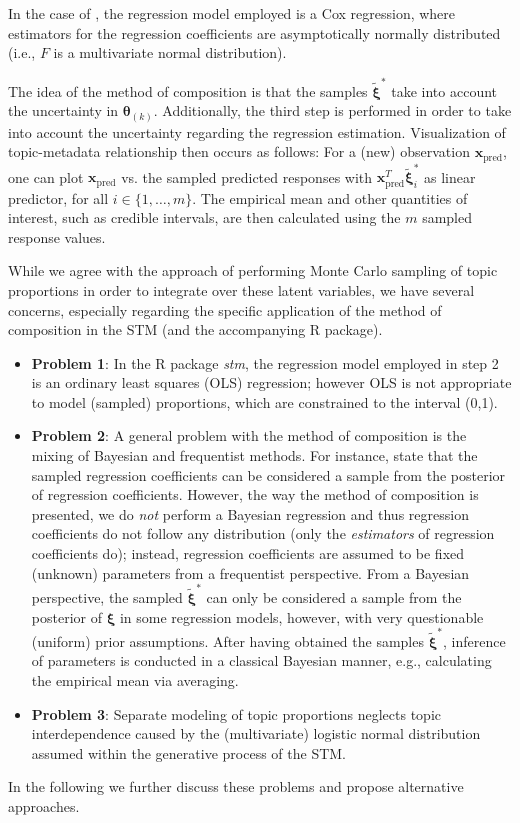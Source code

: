 In the case of \cite{treier2008democracy}, the regression model employed is a Cox regression, where estimators for the regression coefficients are asymptotically normally distributed (i.e., $F$ is a multivariate normal distribution).

The idea of the method of composition is that the samples $\tilde{\boldsymbol{\xi}}^*$ take into account the uncertainty in $\boldsymbol{\theta}_{(k)}$. Additionally, the third step is performed in order to take into account the uncertainty regarding the regression estimation. Visualization of topic-metadata relationship then occurs as follows: For a (new) observation $\boldsymbol{x}_{\text{pred}}$, one can plot $\boldsymbol{x}_{\text{pred}}$ vs. the sampled predicted responses with $\boldsymbol{x}_{\text{pred}}^T \tilde{\boldsymbol{\xi}}_i^*$ as linear predictor, for all $i \in \{1,\dots,m\}$. The empirical mean and other quantities of interest, such as credible intervals, are then calculated using the $m$ sampled response values.

While we agree with the approach of performing Monte Carlo sampling of topic proportions in order to integrate over these latent variables, we have several concerns, especially regarding the specific application of the method of composition in the STM (and the accompanying R package).
\begin{itemize}
\item \textbf{Problem 1}: In the R package \textit{stm}, the regression model employed in step 2 is an ordinary least squares (OLS) regression; however OLS is not appropriate to model (sampled) proportions, which are constrained to the interval (0,1).
\item \textbf{Problem 2}: A general problem with the method of composition is the mixing of Bayesian and frequentist methods. For instance, \cite{treier2008democracy} state that the sampled regression coefficients can be considered a sample from the posterior of regression coefficients. However, the way the method of composition is presented, we do \textit{not} perform a Bayesian regression and thus regression coefficients do not follow any distribution (only the \textit{estimators} of regression coefficients do); instead, regression coefficients are assumed to be fixed (unknown) parameters from a frequentist perspective. From a Bayesian perspective, the sampled $\tilde{\boldsymbol{\xi}}^*$ can only be considered a sample from the posterior of $\boldsymbol{\xi}$ in some regression models, however, with very questionable (uniform) prior assumptions. After having obtained the samples $\tilde{\boldsymbol{\xi}}^*$, inference of parameters is conducted in a classical Bayesian manner, e.g., calculating the empirical mean via averaging.
\item \textbf{Problem 3}: Separate modeling of topic proportions neglects topic interdependence caused by the (multivariate) logistic normal distribution assumed within the generative process of the STM.
\end{itemize}
In the following we further discuss these problems and propose alternative approaches.

